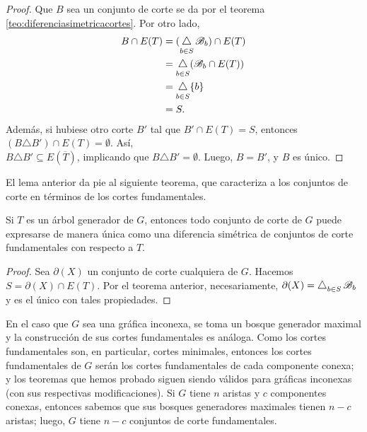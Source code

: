 \begin{proof}
Que $B$ sea un conjunto de corte se da por el teorema \ref{teo:diferenciasimetricacortes}. Por otro lado,
\begin{align*}
    B \cap E(T) &=(\difsym_{b \in S} \mathscr{B}_{b}) \cap E(T) \\
             &=\difsym_{b \in S} (\mathscr{B}_{b} \cap E(T)) \\
             &=\difsym_{b\in S} \{b\} \\
             &= S.
\end{align*}
Además, si hubiese otro corte $B'$ tal que $B' \cap E(T)= S$, entonces $(B \triangle B') \cap E(T) = \emptyset$. Así, \\$B \triangle B' \subseteq E(\overline{T})$, implicando que $B \triangle B' = \emptyset$. Luego, $B = B'$, y $B$ es único.

\end{proof}

El lema anterior da pie al siguiente teorema, que caracteriza a los conjuntos de corte en términos de los cortes fundamentales.

\begin{teo} \label{teo:basecortesfundamentales}
Si $T$ es un árbol generador de $G$, entonces todo conjunto de corte de $G$ puede expresarse de manera única como una diferencia simétrica de conjuntos de corte fundamentales con respecto a $T$.
\end{teo}

\begin{proof}
Sea $\partial(X)$ un conjunto de corte cualquiera de $G$. Hacemos $S= \partial(X) \cap E(T)$. Por el teorema anterior, necesariamente, $\partial(X) = \difsym_{b \in S} \mathscr{B}_{b}$ y es el único con tales propiedades.

\end{proof}

En el caso que $G$ sea una gráfica inconexa, se toma un bosque generador maximal y la construcción de sus cortes fundamentales es análoga. Como los cortes fundamentales son, en particular, cortes minimales, entonces los cortes fundamentales de $G$ serán los cortes fundamentales de cada componente conexa; y los teoremas que hemos probado siguen siendo válidos para gráficas inconexas (con sus respectivas modificaciones). Si $G$ tiene $n$ aristas y $c$ componentes conexas, entonces sabemos que sus bosques generadores maximales tienen $n-c$ aristas; luego, $G$ tiene $n - c$ conjuntos de corte fundamentales. 


